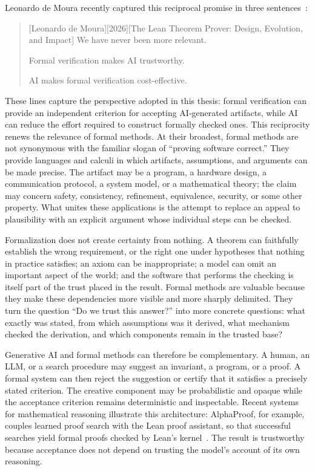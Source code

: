 Leonardo de Moura recently captured this reciprocal promise in three
sentences~\cite{deMoura2026floc}:
\begin{quotation}[Leonardo de Moura][2026][The Lean Theorem Prover: Design, Evolution, and Impact]
  We have never been more relevant.

  Formal verification makes AI trustworthy.

  AI makes formal verification cost-effective.
\end{quotation}

These lines capture the perspective adopted in this thesis: formal verification
can provide an independent criterion for accepting AI-generated artifacts,
while AI can reduce the effort required to construct formally checked ones.
This reciprocity renews the relevance of formal methods. At their broadest,
formal methods are not synonymous with the familiar slogan of ``proving
software correct.'' They provide languages and calculi in which artifacts,
assumptions, and arguments can be made precise. The artifact may be a program,
a hardware design, a communication protocol, a system model, or a mathematical
theory; the claim may concern safety, consistency, refinement, equivalence,
security, or some other property. What unites these applications is the attempt
to replace an appeal to plausibility with an explicit argument whose individual
steps can be checked.

Formalization does not create certainty from nothing. A theorem can faithfully
establish the wrong requirement, or the right one under hypotheses that nothing
in practice satisfies; an axiom can be inappropriate; a model can omit
an important aspect of the world; and the software that performs the checking
is itself part of the trust placed in the result. Formal methods are valuable
because they make these dependencies more visible and more sharply delimited.
They turn the question ``Do we trust this answer?'' into more concrete
questions: what exactly was stated, from which assumptions was it derived, what
mechanism checked the derivation, and which components remain in the trusted
base?

Generative AI and formal methods can therefore be complementary. A human, an
LLM, or a search procedure may suggest an invariant, a program, or a proof. A
formal system can then reject the suggestion or certify that it satisfies a
precisely stated criterion. The creative component may be probabilistic and
opaque while the acceptance criterion remains deterministic and inspectable.
Recent systems for mathematical reasoning illustrate this architecture:
AlphaProof, for example, couples learned proof search with the Lean proof
assistant, so that successful searches yield formal proofs checked by Lean's
kernel~\cite{hubert2026alphaproof}. The result is trustworthy because acceptance
does not depend on trusting the model's account of its own reasoning.

